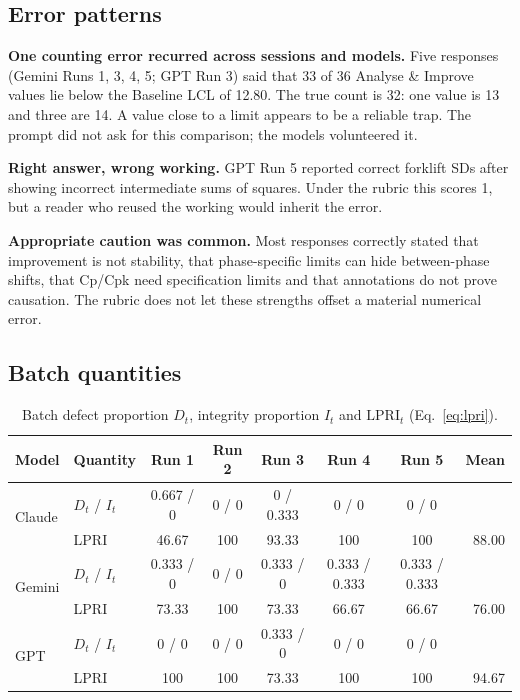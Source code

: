 \documentclass[11pt]{article}
\newcommand{\LPRI}{\mathrm{LPRI}}
\begin{document}
\subsection{Error patterns}
\textbf{One counting error recurred across sessions and models.} Five responses (Gemini Runs 1, 3, 4, 5; GPT Run 3) said that 33 of 36 Analyse \& Improve values lie below the Baseline LCL of 12.80. The true count is 32: one value is 13 and three are 14. A value close to a limit appears to be a reliable trap. The prompt did not ask for this comparison; the models volunteered it.

\textbf{Right answer, wrong working.} GPT Run 5 reported correct forklift SDs after showing incorrect intermediate sums of squares. Under the rubric this scores 1, but a reader who reused the working would inherit the error.

\textbf{Appropriate caution was common.} Most responses correctly stated that improvement is not stability, that phase-specific limits can hide between-phase shifts, that Cp/Cpk need specification limits and that annotations do not prove causation. The rubric does not let these strengths offset a material numerical error.

\subsection{Batch quantities}
\begin{table}[!htbp]
\centering\small
\caption{Batch defect proportion $D_t$, integrity proportion $I_t$ and $\LPRI_t$ (Eq.~\ref{eq:lpri}).}\label{tab:batch}
\begin{tabular}{@{}llcccccr@{}}
\toprule
Model & Quantity & Run 1 & Run 2 & Run 3 & Run 4 & Run 5 & Mean \\
\midrule
\multirow{2}{*}{Claude} & $D_t$ / $I_t$ & 0.667 / 0 & 0 / 0 & 0 / 0.333 & 0 / 0 & 0 / 0 & \\
 & LPRI & 46.67 & 100 & 93.33 & 100 & 100 & 88.00 \\
\multirow{2}{*}{Gemini} & $D_t$ / $I_t$ & 0.333 / 0 & 0 / 0 & 0.333 / 0 & 0.333 / 0.333 & 0.333 / 0.333 & \\
 & LPRI & 73.33 & 100 & 73.33 & 66.67 & 66.67 & 76.00 \\
\multirow{2}{*}{GPT} & $D_t$ / $I_t$ & 0 / 0 & 0 / 0 & 0.333 / 0 & 0 / 0 & 0 / 0 & \\
 & LPRI & 100 & 100 & 73.33 & 100 & 100 & 94.67 \\
\bottomrule
\end{tabular}
\end{table}
\end{document}
